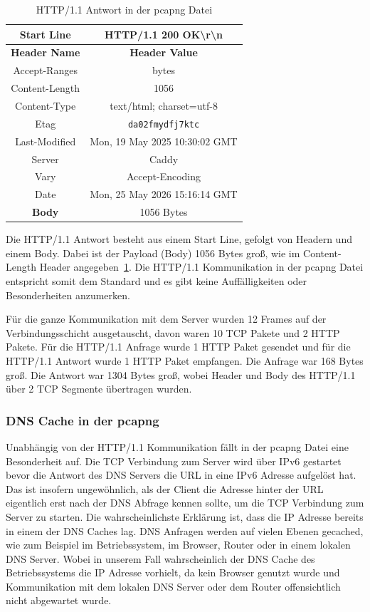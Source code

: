 \begin{table}[h]
    \centering
    \begin{tabular}{|c|c|}
        \hline
        \textbf{Start Line} & HTTP/1.1 200 OK\textbackslash r\textbackslash n \\
        \hline
        \textbf{Header Name} & \textbf{Header Value} \\
        \hline
        Accept-Ranges & bytes \\
        Content-Length & 1056 \\
        Content-Type & text/html; charset=utf-8 \\
        Etag & \texttt{da02fmydfj7ktc} \\
        Last-Modified & Mon, 19 May 2025 10:30:02 GMT \\
        Server & Caddy \\
        Vary & Accept-Encoding \\
        Date & Mon, 25 May 2026 15:16:14 GMT \\
        \hline
        \textbf{Body} & 1056 Bytes \\
        \hline
    \end{tabular}
    \caption{HTTP/1.1 Antwort in der pcapng Datei}\label{tab:http11-header-response}
\end{table}

Die HTTP/1.1 Antwort besteht aus einem Start Line, gefolgt von Headern und einem Body. Dabei ist der Payload (Body) 1056 Bytes groß, wie im Content-Length Header angegeben~\ref{tab:http11-header-response}.
Die HTTP/1.1 Kommunikation in der pcapng Datei entspricht somit dem Standard und es gibt keine Auffälligkeiten oder Besonderheiten anzumerken.

Für die ganze Kommunikation mit dem Server wurden 12 Frames auf der Verbindungsschicht ausgetauscht, davon waren 10 TCP Pakete und 2 HTTP Pakete.
Für die HTTP/1.1 Anfrage wurde 1 HTTP Paket gesendet und für die HTTP/1.1 Antwort wurde 1 HTTP Paket empfangen.
Die Anfrage war 168 Bytes groß.
Die Antwort war 1304 Bytes groß, wobei Header und Body des HTTP/1.1 über 2 TCP Segmente übertragen wurden.

\subsubsection*{DNS Cache in der pcapng}
Unabhängig von der HTTP/1.1 Kommunikation fällt in der pcapng Datei eine Besonderheit auf.
Die TCP Verbindung zum Server wird über IPv6 gestartet bevor die Antwort des DNS Servers die URL in eine IPv6 Adresse aufgelöst hat.
Das ist insofern ungewöhnlich, als der Client die Adresse hinter der URL eigentlich erst nach der DNS Abfrage kennen sollte, um die TCP Verbindung zum Server zu starten.
Die wahrscheinlichste Erklärung ist, dass die IP Adresse bereits in einem der DNS Caches lag.
DNS Anfragen werden auf vielen Ebenen gecached, wie zum Beispiel im Betriebssystem, im Browser, Router oder in einem lokalen DNS Server.
Wobei in unserem Fall wahrscheinlich der DNS Cache des Betriebssystems die IP Adresse vorhielt, da kein Browser genutzt wurde und Kommunikation mit dem lokalen DNS Server oder dem Router offensichtlich nicht abgewartet wurde.
